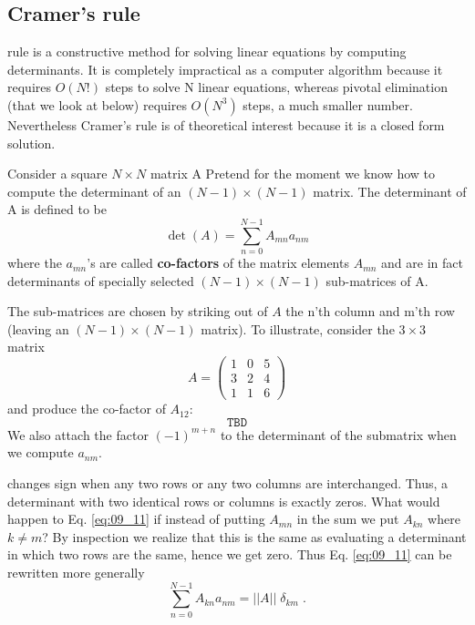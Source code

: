 \subsection{Cramer's rule}

 rule is a constructive method for solving linear equations
by computing determinants. It is completely impractical
as a computer algorithm because it requires $O(N!)$ steps to solve
N linear equations, whereas pivotal elimination (that we look at
below) requires $O(N^3)$ steps, a much smaller number. Nevertheless Cramer's
rule is of theoretical interest because it is a closed form solution.

Consider a square $N\times N$ matrix A Pretend for the moment we
know how to compute the determinant of an $(N-1)\times(N-1)$
matrix. The determinant of A is defined to be
\begin{equation}
    \label{eq:09_10}
    \det(A) = \sum_{n=0}^{N-1}A_{mn} a_{nm} 
\end{equation}
where the $a_{mn}$'s are called \textbf{co-factors} of the matrix elements $A_{mn}$
and are in fact determinants of specially selected $(N-1)\times(N-1)$
sub-matrices of A.

The sub-matrices are chosen by striking out of $A$ the n'th column
and m'th row (leaving an $(N-1)\times(N-1)$ matrix). To illustrate,
consider the $3 \times 3$ matrix
\begin{equation}
    \label{eq:09_11}
    A = 
    \begin{pmatrix}
        1 & 0 & 5\\ 
        3 & 2 & 4\\ 
        1 & 1 & 6
    \end{pmatrix}
\end{equation}
and produce the co-factor of $A_{12}$:
\begin{equation}
	\texttt{TBD}\label{eq:09_12}
\end{equation}
We also attach the factor $(-1)^{m+n}$ to the determinant of the
submatrix when we compute $a_{nm}$.

 changes sign when any two rows or any two 
columns are interchanged. Thus, a determinant with two identical rows or
columns is exactly zeros. What would happen to
Eq. \ref{eq:09_11} if instead of putting $A_{mn}$ in the sum we put $A_{kn}$ where
$k\neq m$? By inspection we realize that this is the same as evaluating
a determinant in which two rows are the same, hence we get zero.
Thus Eq. \ref{eq:09_11} can be rewritten more generally
\begin{equation}
	\sum_{n=0}^{N-1}A_{kn}a_{nm}=||A||\;\delta_{km}\;.\label{eq:09_13}
\end{equation}

